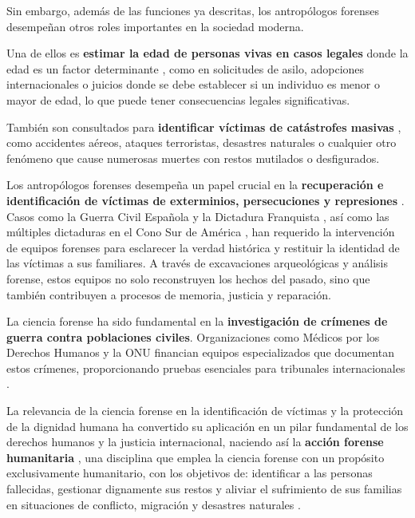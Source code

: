 Sin embargo, además de las funciones ya descritas, los antropólogos forenses desempeñan otros roles importantes en la 
sociedad moderna.

Una de ellos es \textbf{estimar la edad de personas vivas en casos legales} donde la edad es un factor determinante 
\cite{schmeling2016}, como en solicitudes de asilo, adopciones internacionales o juicios donde se debe establecer si un 
individuo es menor o mayor de edad, lo que puede tener consecuencias legales significativas.

También son consultados para  \textbf{identificar víctimas de catástrofes masivas} \cite{deBoer2019, prinz2007}, 
como accidentes aéreos, ataques terroristas, desastres naturales o cualquier otro fenómeno que cause numerosas 
muertes con restos mutilados o desfigurados.

Los antropólogos forenses desempeña un papel crucial en la \textbf{recuperación e identificación de víctimas de exterminios, 
persecuciones y represiones} \cite{skinner2003}. Casos como la Guerra Civil Española y la Dictadura Franquista 
\cite{sanchisgimeno2024, baeta2015}, así como las múltiples dictaduras en el Cono Sur de América \cite{ataliva2024}, 
han requerido la intervención de equipos forenses para esclarecer la verdad histórica y restituir la identidad de las 
víctimas a sus familiares. A través de excavaciones arqueológicas y análisis forense, estos equipos no solo reconstruyen 
los hechos del pasado, sino que también contribuyen a procesos de memoria, justicia y reparación.

La ciencia forense ha sido fundamental en la \textbf{investigación de crímenes de guerra contra poblaciones civiles}. 
Organizaciones como Médicos por los Derechos Humanos y la ONU financian equipos especializados que documentan 
estos crímenes, proporcionando pruebas esenciales para tribunales internacionales \cite{tanaka2020}.

La relevancia de la ciencia forense en la identificación de víctimas y la protección de la dignidad humana ha convertido 
su aplicación en un pilar fundamental de los derechos humanos y la justicia internacional, naciendo así la  
\textbf{acción forense humanitaria} \cite{cordner2017}, una disciplina que emplea la ciencia forense con un propósito 
exclusivamente humanitario, con los objetivos de: identificar a las personas fallecidas, gestionar dignamente sus restos y 
aliviar el sufrimiento de sus familias en situaciones de conflicto, migración y desastres naturales \cite{tidballbinz2021}. 

